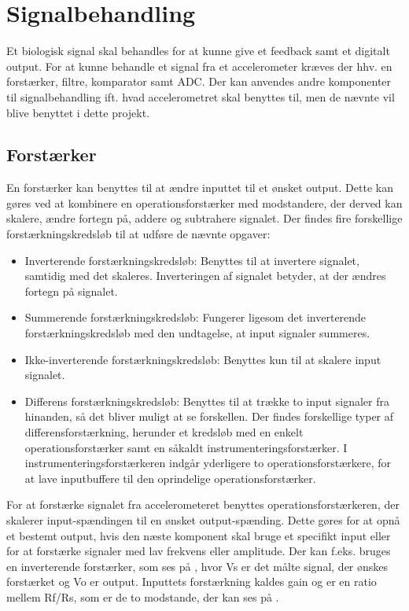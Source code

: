 \section{Signalbehandling}
Et biologisk signal skal behandles for at kunne give et feedback samt et digitalt output. For at kunne behandle et signal fra et accelerometer kræves der hhv. en forstærker, filtre, komparator samt ADC. Der kan anvendes andre komponenter til signalbehandling ift. hvad accelerometret skal benyttes til, men de nævnte vil blive benyttet i dette projekt. 

\subsection{Forstærker}
En forstærker kan benyttes til at ændre inputtet til et ønsket output. Dette kan gøres ved at kombinere en operationsforstærker med modstandere, der derved kan skalere, ændre fortegn på, addere og subtrahere signalet. Der findes fire forskellige forstærkningskredsløb til at udføre de nævnte opgaver: \cite{Nilsson2011}
\begin{itemize}
\item Inverterende forstærkningskredsløb: Benyttes til at invertere signalet, samtidig med det skaleres. Inverteringen af signalet betyder, at der ændres fortegn på signalet.
\item Summerende forstærkningskredsløb: Fungerer ligesom det inverterende forstærkningskredsløb med den undtagelse, at input signaler summeres.
\item Ikke-inverterende forstærkningskredsløb: Benyttes kun til at skalere input signalet.
\item Differens forstærkningskredsløb: Benyttes til at trække to input signaler fra hinanden, så det bliver muligt at se forskellen\cite{Nilsson2011}. Der findes forskellige typer af differensforstærkning, herunder et kredsløb med en enkelt operationsforstærker samt en såkaldt instrumenteringsforstærker. I instrumenteringsforstærkeren indgår yderligere to operationsforstærkere, for at lave inputbuffere til den oprindelige operationsforstærker.  
\end{itemize} 

For at forstærke signalet fra accelerometeret benyttes operationsforstærkeren, der skalerer input-spændingen til en ønsket output-spænding. Dette gøres for at opnå et bestemt output, hvis den næste komponent skal bruge et specifikt input eller for at forstærke signaler med lav frekvens eller amplitude. Der kan f.eks. bruges en inverterende forstærker, som ses på , hvor Vs er det målte signal, der ønskes forstærket og Vo er output. Inputtets forstærkning kaldes gain og er en ratio mellem Rf/Rs, som er de to modstande, der kan ses på . \cite{Nilsson2011}

